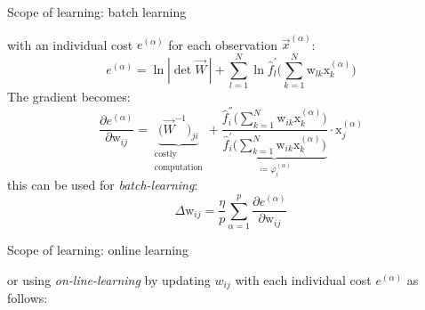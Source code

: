 \begin{frame}{Scope of learning: batch learning}

with an individual cost $e^{(\alpha)}$ for each observation $\vec{x}^{(\alpha)}$:
\begin{equation}
	e^{(\alpha)} = \ln |\det \vec{W}\,| + \sum\limits_{l = 1}^N \ln
		\widehat{f}_l^{'} \Bigg( \sum\limits_{k = 1}^N 
		\mathrm{w}_{lk} \mathrm{x}_k^{(\alpha)} \Bigg)
\end{equation}
The gradient becomes:
\begin{equation}
	\frac{\partial e^{(\alpha)}}{\partial \mathrm{w}_{ij}}
	= \underbrace{ \big( \vec{W}^{-1} \big)_{ji} }_{
		\substack{ \text{costly} \\ \text{computation}} }
		+ \underbrace{  
			\frac{ \widehat{f}_i^{''} \bigg( \sum\limits_{k = 1}^N 
				\mathrm{w}_{ik} \mathrm{x}_k^{(\alpha)} \bigg)
			}{\widehat{f}_i^{'} \bigg( \sum\limits_{k = 1}^N 
			\mathrm{w}_{ik} \mathrm{x}_k^{(\alpha)} \bigg)}
			 }_{ \coloneqq \varphi_i^{(\alpha)} }
		\cdot \mathrm{x}_j^{(\alpha)}
		\label{eq:gradstandardonline}
\end{equation}
this can be used for \emph{batch-learning}:
\begin{equation}
	\Delta \mathrm{w}_{ij}
	= \frac{\eta}{p} \sum\limits_{\alpha = 1}^p 
	\frac{\partial e^{(\alpha)}}{\partial \mathrm{w}_{ij}}
\end{equation}

\end{frame}

\begin{frame}{Scope of learning: online learning}

or using \emph{on-line-learning} by updating $w_{ij}$ with each individual cost $e^{(\alpha)}$ as follows:


\end{frame}

